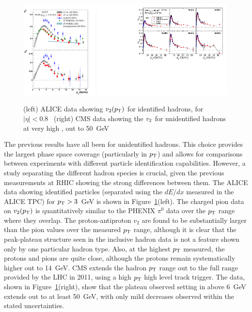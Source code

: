 \begin{figure}[!tb]
\begin{center}
\includegraphics[width=0.35\textwidth]{flowcorrelations_figs/alice_fig5_vn_pid.pdf}
\includegraphics[width=0.63\textwidth]{flowcorrelations_figs/v2_pt_ep_atlas_alice_eta0-1_band_v5.pdf}
\caption[]{(left) ALICE data showing $\mbox{$v_2$}(\mbox{$p_{\mathrm{T}}$})$ for identified
  hadrons, for $|\eta|<0.8$~\cite{Abelev:2012di} (right) CMS data
  showing the $\mbox{$v_2$}$ for unidentified hadrons at very high \pT, out
  to 50~GeV~\cite{Chatrchyan:2012xq}}
\label{fig:pas:fc:highpt}
\end{center}
\end{figure}
The previous results have all been for unidentified hadrons.  This choice provides the largest phase
space coverage (particularly in $\mbox{$p_{\mathrm{T}}$}$) and allows for comparisons between experiments with different particle
identification capabilities.  However, a study separating the different hadron species is crucial,
given the previous measurements at RHIC showing the strong differences between them.
The ALICE data showing identified particles (separated using the $dE/dx$ measured in the ALICE TPC) for $\mbox{$p_{\mathrm{T}}$}>3$~GeV
is shown in Figure~\ref{fig:pas:fc:highpt}(left).  The charged pion data on $v_2(\mbox{$p_{\mathrm{T}}$})$ is quantitatively similar to
the PHENIX $\pi^0$ data over the $\mbox{$p_{\mathrm{T}}$}$ range where they overlap.  The proton-antiproton $v_2$ are found to be
substantially larger than the pion values over the measured $\mbox{$p_{\mathrm{T}}$}$ range, although it is clear that the peak-plateau
structure seen in the inclusive hadron data is not a feature shown only
by one particular hadron type.
Also, at the highest $\mbox{$p_{\mathrm{T}}$}$ measured, the protons and pions are quite close, although the protons remain
systematically higher out to 14~GeV.
CMS extends the hadron $\mbox{$p_{\mathrm{T}}$}$ range out to the full range provided by the LHC in 2011, using a high $\mbox{$p_{\mathrm{T}}$}$
high level track trigger.  The data, shown in Figure~\ref{fig:pas:fc:highpt}(right), show that the
plateau observed setting in above 6~GeV extends out to at least 50~GeV, with only mild decreases observed within
the stated uncertainties.

